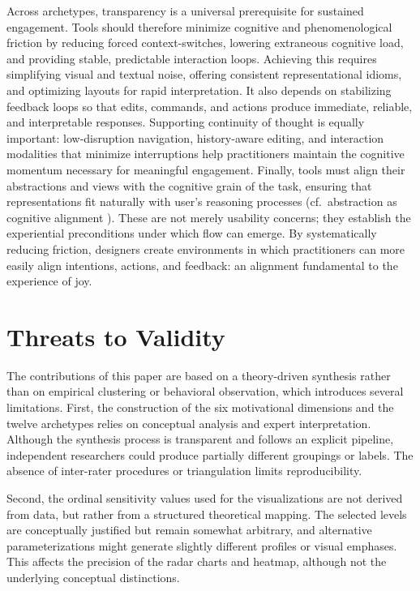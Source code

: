 \documentclass[12pt]{elsarticle}
\begin{document}
Across archetypes, transparency is a universal prerequisite for sustained 
engagement. Tools should therefore minimize cognitive and phenomenological 
friction by reducing forced context-switches, lowering extraneous cognitive 
load, and providing stable, predictable interaction loops. Achieving this 
requires simplifying visual and textual noise, offering consistent 
representational idioms, and optimizing layouts for rapid interpretation. It 
also depends on stabilizing feedback loops so that edits, commands, and actions 
produce immediate, reliable, and interpretable responses. Supporting continuity 
of thought is equally important: low-disruption navigation, history-aware 
editing, and interaction modalities that minimize interruptions help 
practitioners maintain the cognitive momentum necessary for meaningful 
engagement. Finally, tools must align their abstractions and views with the 
cognitive grain of the task, ensuring that representations fit naturally with 
user’s reasoning processes (cf.~abstraction as cognitive alignment 
\cite{green1996usability, kramer2007abstraction}). These are not merely 
usability concerns; they establish the experiential preconditions under which 
flow can emerge. By systematically reducing friction, designers create 
environments in which practitioners can more easily align intentions, actions, 
and feedback: an alignment fundamental to the experience of joy.

\section*{Threats to Validity}
The contributions of this paper are based on a theory-driven synthesis rather than on empirical clustering or behavioral observation, which introduces several limitations. First, the construction of the six motivational dimensions and the twelve archetypes relies on conceptual analysis and expert interpretation. Although the synthesis process is transparent and follows an explicit pipeline, independent researchers could produce partially different groupings or labels. The absence of inter-rater procedures or triangulation limits reproducibility.

Second, the ordinal sensitivity values used for the visualizations are not derived from data, but rather from a structured theoretical mapping. The selected levels are conceptually justified but remain somewhat arbitrary, and alternative parameterizations might generate slightly different profiles or visual emphases. This affects the precision of the radar charts and heatmap, although not the underlying conceptual distinctions.
\end{document}
